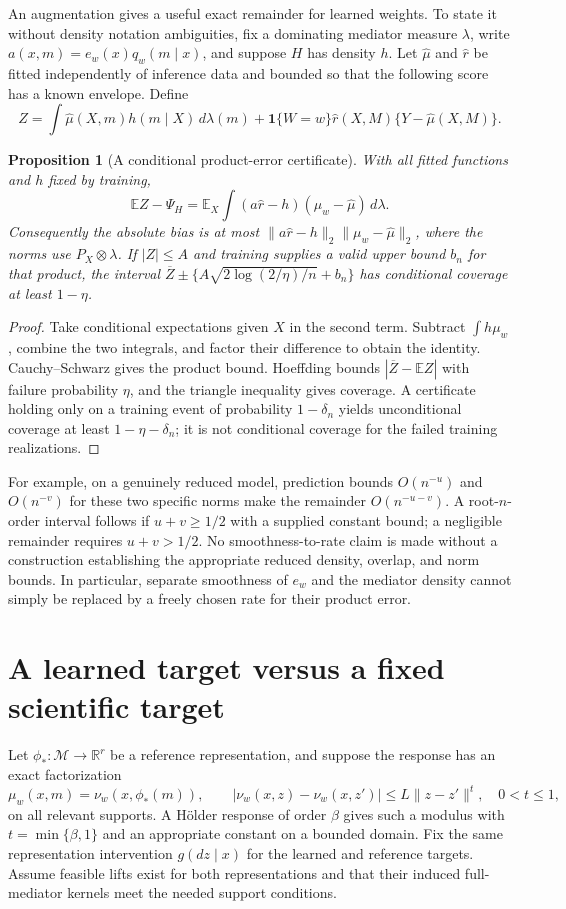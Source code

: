 \documentclass[11pt]{article}
\newtheorem{proposition}[theorem]{Proposition}
\theoremstyle{remark}
\newcommand{\E}{\mathbb E}
\newcommand{\R}{\mathbb R}
\newcommand{\Ind}{\mathbf 1}
\begin{document}
An augmentation gives a useful exact remainder for learned weights. To state it without density notation ambiguities, fix a dominating mediator measure $\lambda$, write $a(x,m)=e_w(x)q_w(m\mid x)$, and suppose $H$ has density $h$. Let $\widehat\mu$ and $\widehat r$ be fitted independently of inference data and bounded so that the following score has a known envelope. Define
\[
 Z=\int\widehat\mu(X,m)h(m\mid X)\,d\lambda(m)
      +\Ind\{W=w\}\widehat r(X,M)\{Y-\widehat\mu(X,M)\}.
\]
\begin{proposition}[A conditional product-error certificate]
With all fitted functions and $h$ fixed by training,
\[
 \E Z-\Psi_H
  =\E_X\int(a\widehat r-h)(\mu_w-\widehat\mu)\,d\lambda.
\]
Consequently the absolute bias is at most
$\|a\widehat r-h\|_2\|\mu_w-\widehat\mu\|_2$, where the norms use $P_X\otimes\lambda$. If $|Z|\leq A$ and training supplies a valid upper bound $b_n$ for that product, the interval
$\overline Z\pm\{A\sqrt{2\log(2/\eta)/n}+b_n\}$ has conditional coverage at least $1-\eta$.
\end{proposition}
\begin{proof}
Take conditional expectations given $X$ in the second term. Subtract $\int h\mu_w$, combine the two integrals, and factor their difference to obtain the identity. Cauchy--Schwarz gives the product bound. Hoeffding bounds $|\overline Z-\E Z|$ with failure probability $\eta$, and the triangle inequality gives coverage. A certificate holding only on a training event of probability $1-\delta_n$ yields unconditional coverage at least $1-\eta-\delta_n$; it is not conditional coverage for the failed training realizations.
\end{proof}

For example, on a genuinely reduced model, prediction bounds $O(n^{-u})$ and $O(n^{-v})$ for these two specific norms make the remainder $O(n^{-u-v})$. A root-$n$-order interval follows if $u+v\geq1/2$ with a supplied constant bound; a negligible remainder requires $u+v>1/2$. No smoothness-to-rate claim is made without a construction establishing the appropriate reduced density, overlap, and norm bounds. In particular, separate smoothness of $e_w$ and the mediator density cannot simply be replaced by a freely chosen rate for their product error.

\section{A learned target versus a fixed scientific target}
Let $\phi_*:\mathcal M\to\R^r$ be a reference representation, and suppose the response has an exact factorization
\[
 \mu_w(x,m)=\nu_w(x,\phi_*(m)),\qquad
 |\nu_w(x,z)-\nu_w(x,z')|\leq L\|z-z'\|^t,
 \quad0<t\leq1,
\]
on all relevant supports. A H\"older response of order $\beta$ gives such a modulus with $t=\min\{\beta,1\}$ and an appropriate constant on a bounded domain. Fix the same representation intervention $g(dz\mid x)$ for the learned and reference targets. Assume feasible lifts exist for both representations and that their induced full-mediator kernels meet the needed support conditions.
\end{document}
